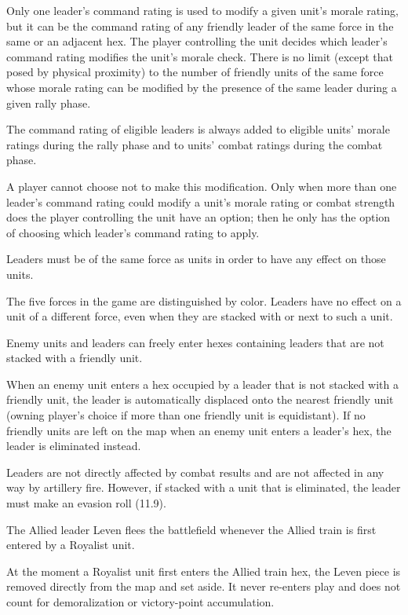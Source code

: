 Only one leader's command rating is used to modify a given unit's morale rating, but it can be the command rating of any friendly leader of the same force in the same or an adjacent hex. The player controlling the unit decides which leader's command rating modifies the unit's morale check. There is no limit (except that posed by physical proximity) to the number of friendly units of the same force whose morale rating can be modified by the presence of the same leader during a given rally phase.

 The command rating of eligible leaders is always added to eligible units' morale ratings during the rally phase and to units' combat ratings during the combat phase.

A player cannot choose not to make this modification. Only when more than one leader's command rating could modify a unit's morale rating or combat strength does the player controlling the unit have an option; then he only has the option of choosing which leader's command rating to apply.

 Leaders must be of the same force as units in order to have any effect on those units.

The five forces in the game are distinguished by color. Leaders have no effect on a unit of a different force, even when they are stacked with or next to such a unit.

 Enemy units and leaders can freely enter hexes containing leaders that are not stacked with a friendly unit.

When an enemy unit enters a hex occupied by a leader that is not stacked with a friendly unit, the leader is automatically displaced onto the nearest friendly unit (owning player's choice if more than one friendly unit is equidistant). If no friendly units are left on the map when an enemy unit enters a leader's hex, the leader is eliminated instead.

 Leaders are not directly affected by combat results and are not affected in any way by artillery fire. However, if stacked with a unit that is eliminated, the leader must make an evasion roll (11.9).

 The Allied leader Leven flees the battlefield whenever the Allied train is first entered by a Royalist unit.

At the moment a Royalist unit first enters the Allied train hex, the Leven piece is removed directly from the map and set aside. It never re-enters play and does not count for demoralization or victory-point accumulation.
